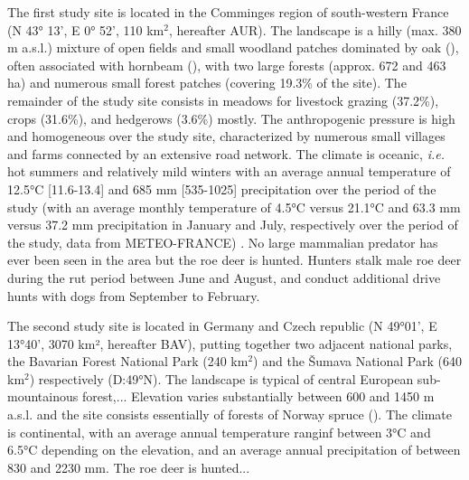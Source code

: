 \documentclass[a4paper,11pt]{article}
\newcommand{\species}[1]{(\xmakefirstuc{\emph{#1}})}
\begin{document}
The first study site is located in the Comminges region of south-western France (N 43° 13',
E 0° 52', 110 km$^2$, hereafter AUR). The landscape is a hilly (max. 380 m a.s.l.) mixture
of open fields and small woodland patches dominated by oak  \species{Quercus spp.}, often associated with hornbeam  \species{Carpinus betulus}, with two large
forests (approx. 672 and 463 ha) and numerous small forest patches (covering
19.3\% of the site). The remainder of the study site consists
in meadows for livestock grazing (37.2\%), crops (31.6\%),
and hedgerows (3.6\%) mostly. The anthropogenic pressure is high and homogeneous over the
study site, characterized by numerous small villages and farms connected by an
extensive road network. The climate is oceanic, \textit{i.e.} hot summers and relatively mild winters with an average annual
temperature of 12.5°C [11.6-13.4] and 685 mm [535-1025] precipitation over the period of the study (with an average monthly temperature of 4.5°C versus 21.1°C and 63.3 mm versus 37.2 mm precipitation in January and July, respectively over the period of the study, data from METEO-FRANCE) . No large mammalian predator has ever been seen in the area but the roe deer is
hunted. Hunters stalk male roe deer during the rut period between June and August, and conduct additional drive hunts with
dogs from September to February. 

The second study site is located in Germany and Czech republic (N 49°01', E 13°40',
3070 km², hereafter BAV), putting together two adjacent national parks, the Bavarian Forest National
Park (240 km$^2$) and the Šumava National Park (640 km$^2$) respectively (D:49°N). The landscape is typical of central European sub-mountainous forest,... 
Elevation varies substantially between 600 and 1450 m a.s.l. and the site consists
essentially of forests of Norway spruce \species{picea abies L.}. The climate
is continental, with an average annual temperature ranginf between 3°C and
6.5°C depending on the elevation, and an average annual precipitation of
between 830 and 2230 mm. The roe deer is hunted...
\end{document}
